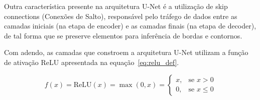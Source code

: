 Outra característica presente na arquitetura U-Net é a utilização de 
skip connections (Conexões de Salto), responsável pelo tráfego de dados entre as 
camadas iniciais (na etapa de encoder) e as camadas finais (na etapa de decoder), 
de tal forma que se preserve elementos para inferência de bordas e contornos. 

Com adendo, as camadas que constroem a arquitetura U-Net utilizam a função de ativação ReLU 
apresentada na equação~\ref{eq:relu_def}.

\begin{equation}
    f(x) = \text{ReLU}(x) = \max(0, x) = 
    \begin{cases} 
        x, & \text{se } x > 0 \\ 
        0, & \text{se } x \le 0 
    \end{cases}
    \label{eq:relu_def}
\end{equation}